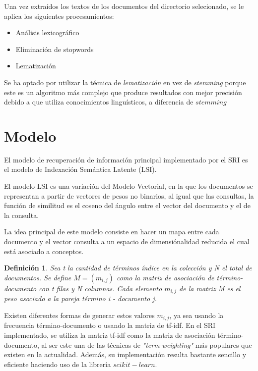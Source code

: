\documentclass[a4paper, 10pt]{article}
\newtheorem{definition}{Definici\'on}
\begin{document}
	Una vez extra\'idos los textos de los documentos del directorio selecionado, se le aplica los siguientes procesamientos:

	\begin{itemize}
		\item An\'alisis lexicogr\'afico
		\item Eliminaci\'on de stopwords
		\item Lematizaci\'on
	\end{itemize}

	Se ha optado por utilizar la t\'ecnica de \textit{lematización} en vez de \textit{stemming} porque este es un algoritmo m\'as complejo que produce resultados con mejor precisi\'on debido a que utiliza conocimientos lingu\'isticos, a diferencia de $stemming$
	
	\section{Modelo}
	El modelo de recuperaci\'on de informaci\'on principal implementado por el SRI es el modelo de Indexaci\'on Sem\'antica Latente (LSI).
	
	El modelo LSI es una variación del Modelo Vectorial, en la que los documentos se representan a partir de vectores de pesos no binarios, al igual que las consultas, la función de similitud es el coseno del ángulo entre el vector del documento y el de la consulta.

	La idea principal de este modelo consiste en hacer un mapa entre cada documento y el vector consulta a un espacio 
	de dimensi\'onalidad reducida el cual est\'a asociado a conceptos.
	
	\begin{definition}
		Sea t la cantidad de t\'erminos \'indice en la colecci\'on y N el total de documentos. Se define $M=(m_{i,j})$ 
		como la matriz de asociaci\'on de t\'ermino-documento con t filas y N columnas. 
		Cada elemento $m_{i, j}$ de la matriz M es el peso asociado a la pareja t\'ermino i - documento j. 
	\end{definition}
	
	Existen diferentes formas de generar estos valores $m_{i,j}$, ya sea usando la frecuencia t\'ermino-documento 
	o usando la matriz de tf-idf. En el SRI implementado, se utiliza la matriz tf-idf como la matriz de asociaci\'on
	t\'ermino-documento, al ser este una de las t\'ecnicas de \textit{"term-weighting"} m\'as populares que existen
	en la actualidad. Adem\'as, su implementaci\'on resulta bastante sencillo y eficiente haciendo uso de la librer\'ia $scikit-learn$.
	
\end{document}
